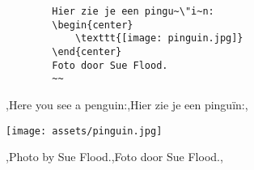 \copyrightVincent





\begin{frame}[fragile]{}
    \vspace{-28px}
    \begin{verbatim}
        Hier zie je een pingu~\"i~n:
        \begin{center}
            \texttt{[image: pinguin.jpg]}
        \end{center}
        Foto door Sue Flood.
        ~~
    \end{verbatim}
    
    \begin{penExResult}
        \lang,Here you see a penguin:,Hier zie je een pinguïn:,
        \begin{center}
            \texttt{[image: assets/pinguin.jpg]}
        \end{center}
        \lang,Photo by Sue Flood.,Foto door Sue Flood.,
    \end{penExResult}
\end{frame}
